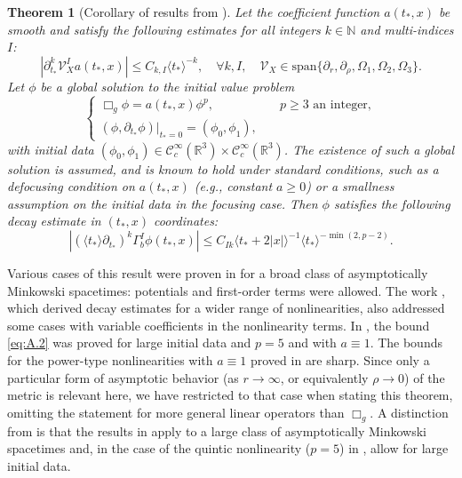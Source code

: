 \documentclass[10pt,a4paper,reqno]{amsart}
\newcommand{\pa}{\partial}
\newcommand{\la}{\langle}
\newcommand{\ra}{\rangle}
\newtheorem{theorem}{Theorem}[section]
\theoremstyle{definition}
\theoremstyle{remark}
\numberwithin{equation}{section}
\newcommand{\N}{{\mathbb N}}
\newcommand{\ts}{t_*}
\begin{document}
\begin{theorem}[Corollary of results from \cite{Looi22,Looi22.2}]\label{thm:power_nonlinearity}
Let the coefficient function $a(t_*, x)$ be smooth and satisfy the following estimates for all integers $k \in \N$ and multi-indices $I$:
\begin{equation}
\label{a(t*,x) estimate in app}
    |\pa_{\ts}^k \mathcal{V}_X^I a(\ts,x)|\leq C_{k, I} \la \ts \ra^{-k},\quad\forall k,I, \quad \mathcal{V}_X\in \mathrm{span}\{\pa_{r}, \pa_\rho, \Omega_1,\Omega_2,\Omega_3\}.
\end{equation}
Let $\phi$ be a global solution to the initial value problem
\begin{equation}
\begin{cases}
\Box_g \phi = a(t_*,x) \phi^p, & \quad p \geq 3 \textrm{ an integer}, \\
(\phi, \partial_{t_*}\phi)|_{t_*=0} = (\phi_0, \phi_1),
\end{cases}
\end{equation}
with initial data $(\phi_0, \phi_1) \in \mathcal{C}_c^\infty(\mathbb{R}^3) \times \mathcal{C}_c^\infty(\mathbb{R}^3)$. The existence of such a global solution is assumed, and is known to hold under standard conditions, such as a defocusing condition on $a(t_*,x)$ (e.g., constant $a \ge 0$) or a smallness assumption on the initial data in the focusing case.
Then $\phi$ satisfies the following decay estimate in $(t_*,x)$ coordinates:
\begin{equation}
|(\langle t_*\rangle\partial_{t_*})^k \Gamma_b^I \phi(t_*,x)| \leq C_{Ik} \langle t_*+2|x| \rangle^{-1} \langle t_*\rangle^{-\min(2,p-2)}.
\label{eq:A.2}
\end{equation}
\end{theorem}

Various cases of this result were proven in \cite{Looi22,Looi22.2} for a broad class of asymptotically Minkowski spacetimes: potentials and first-order terms were allowed. The work \cite{Looi22.2}, which derived decay estimates for a wider range of nonlinearities, also addressed some cases with variable coefficients in the nonlinearity terms. In \cite{Looi22}, the bound \eqref{eq:A.2} was proved for large initial data and $p=5$ and with $a \equiv 1$. The bounds for the power-type nonlinearities with $a\equiv1$ proved in \cite{Looi22,Looi22.2} are sharp. Since only a particular form of asymptotic behavior (as $r\to\infty$, or equivalently $\rho\to0$) of the metric is relevant here, we have restricted to that case when stating this theorem, omitting the statement for more general linear operators than $\Box_g$. A distinction from \cite{Toh2022} is that the results in \cite{Looi22,Looi22.2} apply to a large class of asymptotically Minkowski spacetimes and, in the case of the quintic nonlinearity ($p=5$) in \cite{Looi22}, allow for large initial data. %
\end{document}

